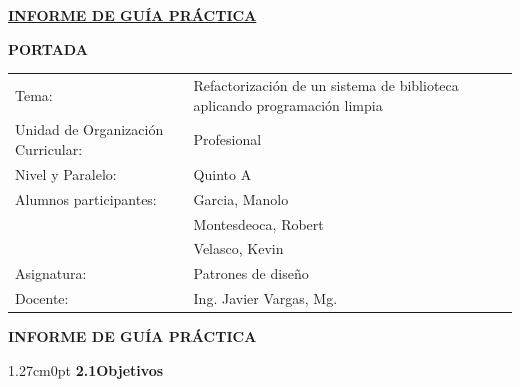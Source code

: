 \documentclass[12pt,letterpaper]{article}
\begin{document}

\begin{center}
  \textbf{\underline{INFORME DE GU\'IA PR\'ACTICA}}
\end{center}

\vspace{4pt}

\noindent{}\textbf{PORTADA}

\vspace{4pt}

\setlength{\tabcolsep}{0pt}
\begin{tabular}{@{}p{6.24cm}p{9.01cm}@{}}
Tema: & Refactorizaci\'on de un sistema de biblioteca aplicando programaci\'on limpia \\[2pt]
Unidad de Organizaci\'on Curricular: & Profesional \\[2pt]
Nivel y Paralelo: & Quinto A \\[2pt]
Alumnos participantes: & Garcia, Manolo \\[1pt]
 & Montesdeoca, Robert \\[1pt]
 & Velasco, Kevin \\[6pt]
Asignatura: & Patrones de dise\~no \\[2pt]
Docente: & Ing. Javier Vargas, Mg. \\
\end{tabular}

\setlength{\tabcolsep}{6pt}

\vspace{10pt}

\noindent{}\textbf{INFORME DE GU\'IA PR\'ACTICA}

\vspace{6pt}

\begin{adjustwidth}{1.27cm}{0pt}
\textbf{2.1\enspace Objetivos}
\end{adjustwidth}
\end{document}
